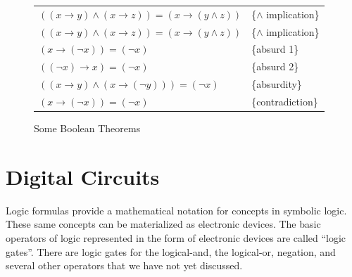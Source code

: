 \begin{figure}
\begin{center}
\begin{tabular}{ll}
$((x \rightarrow y) \wedge (x \rightarrow z)) = (x \rightarrow (y \wedge z))$ & \{$\wedge$ implication\} \label{and-implication} \\
$((x \rightarrow y) \wedge (x \rightarrow z)) = (x \rightarrow (y \wedge z))$ & \{$\wedge$ implication\} \label{and-implication} \\
$(x \rightarrow (\neg x)) = (\neg x)$                                & \{absurd 1\}               \label{absurd-1} \\
$((\neg x) \rightarrow x) = (\neg x)$                                & \{absurd 2\}               \label{absurd-2} \\
$((x \rightarrow y) \wedge (x \rightarrow (\neg y))) = (\neg x)$     & \{absurdity\}              \label{absurdity} \\
$(x \rightarrow (\neg x)) = (\neg x)$                                & \{contradiction\}          \label{boolean-contradiction} \\
\end{tabular}
\end{center}
\caption{Some Boolean Theorems}
\label{some-boolean-theorems}
\end{figure}

\section{Digital Circuits}
\label{sec:digital-circuits}

Logic formulas provide a mathematical notation for concepts in symbolic logic.
These same concepts can be materialized as electronic devices.
The basic operators of logic represented in the form of electronic devices
are called ``logic gates''.
There are logic gates 
for the logical-and, the logical-or, negation, and
several other operators that we have not yet discussed.

